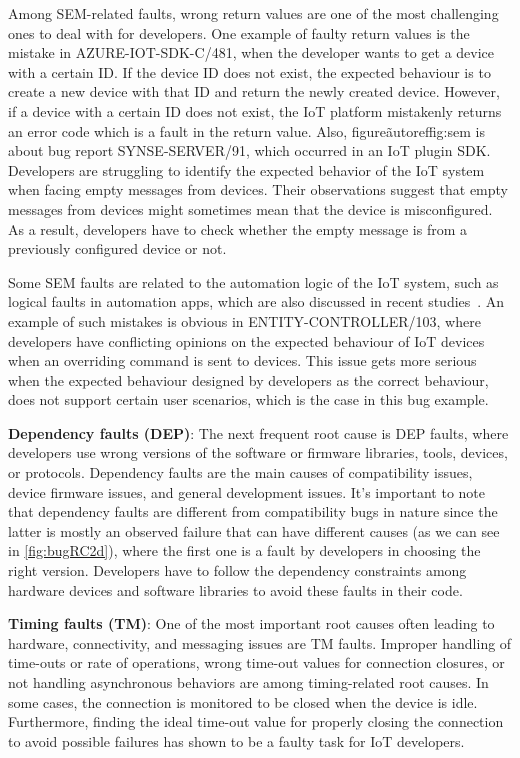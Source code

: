 Among SEM-related faults, wrong return values are one of the most challenging ones to deal with for developers. One example of faulty return values is the mistake in AZURE-IOT-SDK-C/481, when the developer wants to get a device with a certain ID. If the device ID does not exist, the expected behaviour is to create a new device with that ID and return the newly created device. However, if a device with a certain ID does not exist, the IoT platform mistakenly returns an error code which is a fault in the return value. Also, figure\~autoref{fig:sem} is about bug report SYNSE-SERVER/91, which occurred in an IoT plugin SDK. Developers are struggling to identify the expected behavior of the IoT system when facing empty messages from devices. Their observations suggest that empty messages from devices might sometimes mean that the device is misconfigured. As a result, developers have to check whether the empty message is from a previously configured device or not.

Some SEM faults are related to the automation logic of the IoT system, such as logical faults in automation apps, which are also discussed in recent studies~\cite{ISSTA2020Interactions}.  An example of such mistakes is obvious in ENTITY-CONTROLLER/103, where developers have conflicting opinions on the expected behaviour of IoT devices when an overriding command is sent to devices. This issue gets more serious when the expected behaviour designed by developers as the correct behaviour, does not support certain user scenarios, which is the case in this bug example.

\textbf{Dependency faults (DEP)}: The next frequent root cause is DEP faults, where developers use wrong versions of the software or firmware libraries, tools, devices, or protocols. Dependency faults are the main causes of compatibility issues, device firmware issues, and general development issues. It's important to note that dependency faults are different from compatibility bugs in nature since the latter is mostly an observed failure that can have different causes (as we can see in \ref{fig:bugRC2d}), where the first one is a fault by developers in choosing the right version. Developers have to follow the dependency constraints among hardware devices and software libraries to avoid these faults in their code.


\textbf{Timing faults (TM)}: One of the most important root causes often leading to hardware, connectivity, and messaging issues are TM faults. Improper handling of time-outs or rate of operations, wrong time-out values for connection closures, or not handling asynchronous behaviors are among timing-related root causes. In some cases, the connection is monitored to be closed when the device is idle. Furthermore, finding the ideal time-out value for properly closing the connection to avoid possible failures has shown to be a faulty task for IoT developers.

